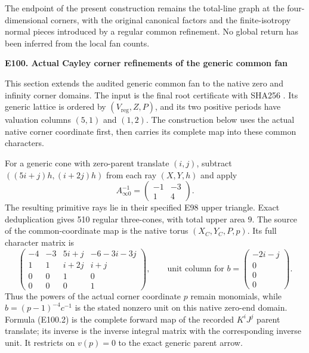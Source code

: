 The endpoint of the present construction remains
the total-line graph at the four-dimensional
corners, with the original canonical factors and
the finite-isotropy normal pieces introduced by
a regular common refinement. No global return
has been inferred from the local fan counts.

\par

\medskip\noindent\textbf{E100. Actual Cayley corner refinements of the generic common fan}

\par\nobreak

This section extends the audited generic common fan to the native zero and infinity corner domains. The input is the final root certificate with SHA256
.
Its generic lattice is ordered by \((V_{\mathrm{reg}},Z,P)\), and its two positive periods have valuation columns \((5,1)\) and \((1,2)\). The construction below uses the actual native corner coordinate first, then carries its complete map into these common characters.

For a generic cone with zero-parent translate \((i,j)\), subtract
\(((5i+j)h,(i+2j)h)\) from each ray \((X,Y,h)\) and apply
\[
 A_{\infty0}^{-1}=
 \begin{pmatrix}-1&-3\\1&4\end{pmatrix}.
 \tag{E100.1}
\]
The resulting primitive rays lie in their specified E98 upper triangle. Exact deduplication gives 510 regular three-cones, with total upper area \(9\). The source of the common-coordinate map is the native torus \((X_C,Y_C,P,p)\). Its full character matrix is
\[
 \begin{pmatrix}
 -4&-3&5i+j&-6-3i-3j\\
 1&1&i+2j&i+j\\
 0&0&1&0\\
 0&0&0&1
 \end{pmatrix},
 \qquad
 \text{unit column for }b=
 \begin{pmatrix}-2i-j\\0\\0\\0\end{pmatrix}.
 \tag{E100.2}
\]
Thus the powers of the actual corner coordinate \(p\) remain monomials, while
\(b=(p-1)^{-4}c^{-1}\) is the stated nonzero unit on this native zero-end domain. Formula (E100.2) is the complete forward map of the recorded \(K^iJ^j\) parent translate; its inverse is the inverse integral matrix with the corresponding inverse unit. It restricts on \(v(p)=0\) to the exact generic parent arrow.

